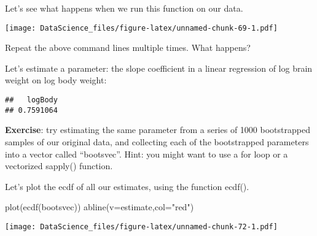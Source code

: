 \documentclass[
]{book}
\newenvironment{Shaded}{\begin{snugshade}}{\end{snugshade}}
\newcommand{\AttributeTok}[1]{\textcolor[rgb]{0.77,0.63,0.00}{#1}}
\newcommand{\DecValTok}[1]{\textcolor[rgb]{0.00,0.00,0.81}{#1}}
\newcommand{\FunctionTok}[1]{\textcolor[rgb]{0.00,0.00,0.00}{#1}}
\newcommand{\NormalTok}[1]{#1}
\newcommand{\OtherTok}[1]{\textcolor[rgb]{0.56,0.35,0.01}{#1}}
\newcommand{\SpecialCharTok}[1]{\textcolor[rgb]{0.00,0.00,0.00}{#1}}
\newcommand{\StringTok}[1]{\textcolor[rgb]{0.31,0.60,0.02}{#1}}
\begin{document}
Let's see what happens when we run this function on our data.

\begin{Shaded}
\end{Shaded}

\texttt{[image: DataScience\_files/figure-latex/unnamed-chunk-69-1.pdf]}

Repeat the above command lines multiple times. What happens?

Let's estimate a parameter: the slope coefficient in a linear regression of log brain weight on log body weight:

\begin{Shaded}
\end{Shaded}

\begin{verbatim}
##   logBody 
## 0.7591064
\end{verbatim}

\textbf{Exercise}: try estimating the same parameter from a series of 1000 bootstrapped samples of our original data, and collecting each of the bootstrapped parameters into a vector called ``bootsvec''. Hint: you might want to use a for loop or a vectorized sapply() function.

Let's plot the ecdf of all our estimates, using the function ecdf().

\begin{Shaded}
\begin{Highlighting}[]
\FunctionTok{plot}\NormalTok{(}\FunctionTok{ecdf}\NormalTok{(bootsvec))}
\FunctionTok{abline}\NormalTok{(}\AttributeTok{v=}\NormalTok{estimate,}\AttributeTok{col=}\StringTok{"red"}\NormalTok{)}
\end{Highlighting}
\end{Shaded}

\texttt{[image: DataScience\_files/figure-latex/unnamed-chunk-72-1.pdf]}
\end{document}
